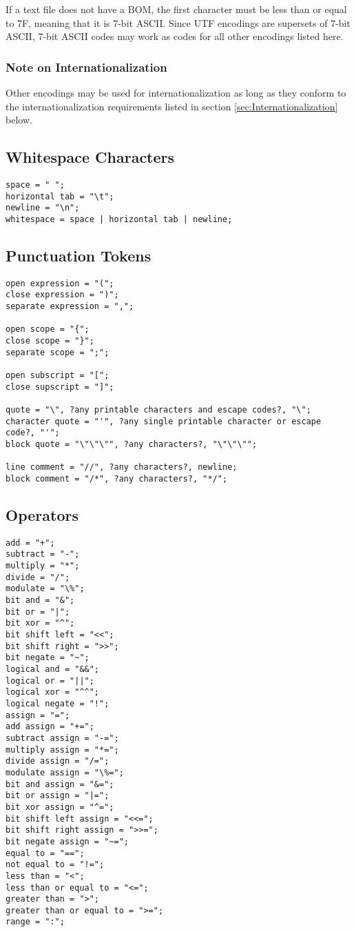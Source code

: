 \documentclass[10pt,a4paper]{article}
\begin{document}
If a text file does not have a BOM, the first character must be less than or equal to 7F, meaning that it is 7-bit ASCII. Since UTF encodings are supersets of 7-bit ASCII, 7-bit ASCII codes may work as codes for all other encodings listed here.

\subsubsection{Note on Internationalization}
Other encodings may be used for internationalization as long as they conform to the internationalization requirements listed in section \ref{sec:Internationalization} below.

\subsection{Whitespace Characters}
\begin{verbatim}
space = " ";
horizontal tab = "\t";
newline = "\n";
whitespace = space | horizontal tab | newline;
\end{verbatim}

\subsection{Punctuation Tokens}
\begin{verbatim}
open expression = "(";
close expression = ")";
separate expression = ",";

open scope = "{";
close scope = "}";
separate scope = ";";

open subscript = "[";
close supscript = "]";

quote = "\", ?any printable characters and escape codes?, "\";
character quote = "'", ?any single printable character or escape code?, "'";
block quote = "\"\"\"", ?any characters?, "\"\"\"";

line comment = "//", ?any characters?, newline;
block comment = "/*", ?any characters?, "*/";
\end{verbatim}

\subsection{Operators}
\begin{verbatim}
add = "+";
subtract = "-";
multiply = "*";
divide = "/";
modulate = "\%";
bit and = "&";
bit or = "|";
bit xor = "^";
bit shift left = "<<";
bit shift right = ">>";
bit negate = "~";
logical and = "&&";
logical or = "||";
logical xor = "^^";
logical negate = "!";
assign = "=";
add assign = "+=";
subtract assign = "-=";
multiply assign = "*=";
divide assign = "/=";
modulate assign = "\%=";
bit and assign = "&=";
bit or assign = "|=";
bit xor assign = "^=";
bit shift left assign = "<<=";
bit shift right assign = ">>=";
bit negate assign = "~=";
equal to = "==";
not equal to = "!=";
less than = "<";
less than or equal to = "<=";
greater than = ">";
greater than or equal to = ">=";
range = ":";
\end{verbatim}
\end{document}

